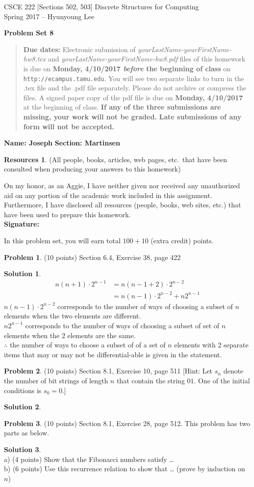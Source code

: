 \documentclass{article}
\theoremstyle{definition}
\newtheorem{problem}{Problem}
\newtheorem*{solution}{Solution}
\newtheorem*{resources}{Resources}
\newcommand{\name}[2]{\noindent\textbf{Name: #1}\hfill \textbf{Section: #2}}
\newcommand{\honor}{\noindent On my honor, as an Aggie, I have neither
  given nor received any unauthorized aid on any portion of the
  academic work included in this assignment. Furthermore, I have
  disclosed all resources (people, books, web sites, etc.) that have
  been used to prepare this homework. \\[2ex]
 \textbf{Signature:} \underline{\hspace*{8cm}} }
\newcommand{\problemset}[1]{\begin{center}\textbf{Problem Set #1}\end{center}}
\newcommand{\duedate}[2]{\begin{quote}\textbf{Due dates:} Electronic
    submission of \textsl{yourLastName-yourFirstName-hw8.tex} and 
    \textsl{yourLastName-yourFirstName-hw8.pdf} files of this homework is due on
    \textbf{#1} on \texttt{http://ecampus.tamu.edu}. You will see two separate links
    to turn in the .tex file and the .pdf file separately. Please do not archive or compress the files.  
    A signed paper copy of the pdf file is due on \textbf{#2} at the beginning of class.
    \textbf{If any of the three submissions are missing, your work will not be graded.}
    \textbf{Late submissions of any form will not be accepted.}\end{quote} }
\begin{document}
\vspace*{-18mm}
\begin{center}
{\large
CSCE 222 [Sections 502, 503] Discrete Structures for Computing\\[.5ex]
Spring 2017 -- Hyunyoung Lee\\}
\end{center}
\problemset{8}
\duedate{Monday, 4/10/2017 \textit{before} the beginning of class}{Monday, 4/10/2017}
\name{ Joseph }{Martinsen}
\begin{resources} (All people, books, articles, web pages, etc.\ that
  have been consulted when producing your answers to this homework)
\end{resources}
\honor

\bigskip

\noindent
In this problem set, you will earn total $100+10$ (extra credit) points.

\begin{problem} (10 points)
Section 6.4, Exercise 38, page 422
\end{problem}
\begin{solution} \ \\
\begin{align*}
  n(n+1) \cdot 2^{n-1} &= n(n-1+2) \cdot 2^{n-2} \\
  &= n(n-1) \cdot 2^{n-2} + n2^{n-1}
\end{align*}
$n(n-1)\cdot 2^{n-2}$ corresponds to the number of ways of choosing a subset of $n$ elements when the two elements are different. \\
$n2^{n-1}$ corresponds to the number of ways of choosing a subset of set of $n$ elements when the 2 elements are the same. \\
$\therefore$ the number of ways to choose a subset of of a set of $n$ elements with 2 separate items that may or may not be differential-able is given in the statement. 
\end{solution}

\begin{problem} (10 points)
Section 8.1, Exercise 10, page 511
[Hint: Let $s_n$ denote the number of bit strings of length $n$ that
contain the string $01$. One of the initial conditions is $s_0 = 0$.] 
\end{problem}
\begin{solution} 
\end{solution}

\begin{problem} (10 points)
Section 8.1, Exercise 28, page 512. This problem has two parts as below. 
\end{problem}
\begin{solution} 
\ \\
a) (4 points) Show that the Fibonacci numbers satisfy \ldots
\ \\
b) (6 points) Use this recurrence relation to show that \ldots 
(prove by induction on $n$)
\end{solution}
\end{document}
